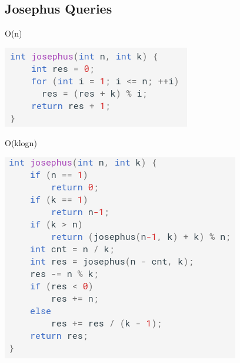 \documentclass[11pt,twocolumn]{article}
\begin{document}
\subsection{Josephus Queries}
O(n)

\includegraphics[scale=0.5]{josephus}

O(klogn)

\includegraphics[scale=0.5]{quickjosephus}
\end{document}
